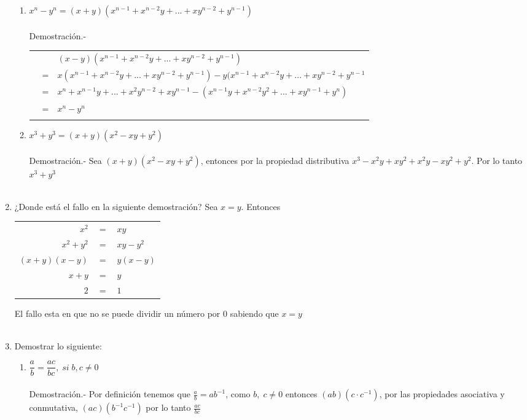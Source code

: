 \begin{enumerate}[\bfseries 1.]
\begin{enumerate}[\bfseries i)]
\item $x^n-y^n=(x+y)(x^{n-1}+x^{n-2} y + ... + xy^{n-2}+y^{n-1})$\\\\
Demostración.- \; 
\begin{center}
\begin{tabular}{r c l}
&&$(x-y)(x^{n-1}+x^{n-2}y+...+xy^{n-2}+y^{n-1})$\\
&=&$x(x^{n-1}+x^{n-2}y+...+xy^{n-2}+y^{n-1})-y(x^{n-1}+x^{n-2}y+...+xy^{n-2}+y^{n-1}$\\
&=&$x^n+x^{n-1}y+...+x^2y^{n-2}+xy^{n-1}-(x^{n-1}y+x^{n-2}y^2+...+xy^{n-1}+y^n)$\\
&=&$x^n-y^n$\\\\	
\end{tabular}
\end{center}

\item $x^3+y^3=(x+y)(x^2-xy+y^2)$\\\\
Demostración.- \; Sea $(x+y)(x^2-xy+y^2)$, entonces por la propiedad distributiva $x^3 -x^2y + xy^2 + x^2y - xy^2 + y^2$. Por lo tanto $x^3+y^3$\\\\
\end{enumerate}

\item ¿Donde está el fallo en la siguiente demostración? Sea $x=y$. Entonces 
\begin{center}
\begin{tabular}{rcl}
$x^2$&$=$&$xy$\\
$x^2 + y^2$&$=$&$xy-y^2$\\
$(x+y)(x-y)$&$=$&$y(x-y)$\\
$x+y$&$=$&$y$\\
$2$&$=$&$1$\\
\end{tabular}
\end{center}
El fallo esta en que no se puede dividir un número por $0$ sabiendo que $x=y$\\\\

\item Demostrar lo siguiente:
\begin{enumerate}[\bfseries i)]
\item $\dfrac{a}{b} = \dfrac{ac}{bc},\; si \; b, c\neq 0$\\\\
Demostración.- \;
Por definición tenemos que $\displaystyle\frac{a}{b}=ab^{-1}$, como $b, \; c \neq 0$ entonces $(ab)(c\cdot c^{-1})$, por  las propiedades asociativa y conmutativa, $(ac)(b^{-1}c^{-1})$ por lo tanto $\displaystyle\frac{ac}{bc}$ \\\\ 


\end{enumerate}
\end{enumerate}
